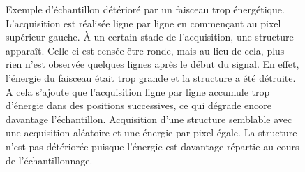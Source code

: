     \begin{figure}[t]
        \centering
        \hspace{1em}
        \caption{\protect{} Exemple d'échantillon détérioré par un faisceau trop énergétique. L'acquisition est réalisée ligne par ligne en commençant au pixel supérieur gauche. \`A un certain stade de l'acquisition, une structure apparaît. Celle-ci est censée être ronde, mais au lieu de cela, plus rien n'est observée quelques lignes après le début du signal. En effet, l'énergie du faisceau était trop grande et la structure a été détruite. A cela s'ajoute que l'acquisition ligne par ligne accumule trop d'énergie dans des positions successives, ce qui dégrade encore davantage l'échantillon. \protect{} Acquisition d'une structure semblable avec une acquisition aléatoire et une énergie par pixel égale. La structure n'est pas détériorée puisque l'énergie est davantage répartie au cours de l'échantillonnage.
            \protect\label{fig-echantillon-deteriore}}
    \end{figure}

